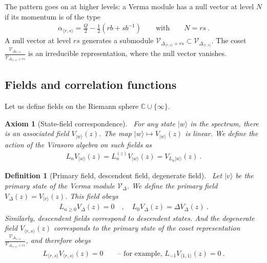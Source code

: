 \documentclass[12pt, a4paper]{article}
\theoremstyle{break}
\newtheorem{hyp}[exo]{Axiom}
\newtheorem{defn}[exo]{Definition}
\begin{document}
The pattern goes on at higher levels: a Verma module has a null vector at level $N$ if its momentum is of the type 
\begin{align}
  \alpha_{\langle r,s\rangle} = \frac{Q}{2} - \frac12(rb+sb^{-1})\qquad \text{with} \qquad N=rs\ .
  \label{eq:ars}
 \end{align}
A null vector at level $rs$ generates a submodule $\mathcal V_{\Delta_{\langle r,s\rangle} +rs}\subset \mathcal V_{\Delta_{\langle r,s\rangle}}$. The coset $\frac{ \mathcal V_{\Delta_{\langle r,s\rangle}} }{ \mathcal V_{\Delta_{\langle r,s\rangle} +rs} }$ is an irreducible representation, where the null vector vanishes.


\subsection{Fields and correlation functions}

Let us define fields on the Riemann sphere $\mathbb{C}\cup\{\infty\}$. 

\begin{hyp}[State-field correspondence]
 ~\label{hyp:sfc}
For any state $|w\rangle$ in the spectrum, there is an associated field $V_{|w\rangle}(z)$. The map $|w\rangle \mapsto V_{|w\rangle}(z)$ is linear. We define the action of the Virasoro algebra on such fields as 
\begin{align}
 L_n V_{|w\rangle}(z) =  L_n^{(z)} V_{|w\rangle}(z) = V_{L_n|w\rangle}(z)\ .
\end{align}
\end{hyp}

\begin{defn}[Primary field, descendent field, degenerate field]
~\label{def:pfdf}
Let $|v\rangle$ be the primary state of the Verma module $\mathcal V_\Delta$.
We define the primary field $V_\Delta(z)=V_{|v\rangle}(z)$. This field obeys
\begin{align}
 L_{n\geq 0} V_\Delta(z) = 0 \quad , \quad L_0 V_\Delta(z) = \Delta V_\Delta(z)\ .
\end{align}
Similarly, descendent fields correspond to descendent states. And the degenerate field $V_{\langle r,s\rangle}(z)$ corresponds to the primary state of the coset representation $\frac{ \mathcal V_{\Delta_{\langle r,s\rangle}} }{ \mathcal V_{\Delta_{\langle r,s\rangle} +rs} }$, and therefore obeys 
\begin{align}
 L_{\langle r, s\rangle} V_{\langle r,s\rangle}(z) = 0\qquad \text{-- for example, \ } L_{-1}V_{\langle 1,1\rangle}(z) = 0\ .
\end{align}
\end{defn}
\end{document}
